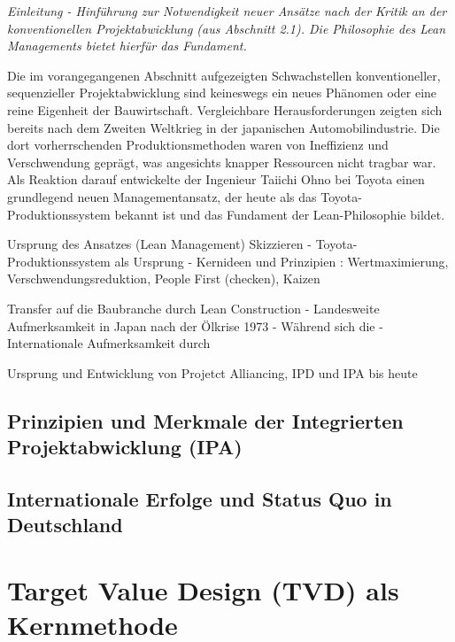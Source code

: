 
\textit{Einleitung - Hinführung zur Notwendigkeit neuer Ansätze nach der Kritik an der konventionellen Projektabwicklung (aus Abschnitt 2.1). Die Philosophie des Lean Managements bietet hierfür das Fundament.}

Die im vorangegangenen Abschnitt aufgezeigten Schwachstellen konventioneller, sequenzieller Projektabwicklung sind keineswegs ein neues Phänomen oder eine reine Eigenheit der Bauwirtschaft. Vergleichbare Herausforderungen zeigten sich bereits nach dem Zweiten Weltkrieg in der japanischen Automobilindustrie. Die dort vorherrschenden Produktionsmethoden waren von Ineffizienz und Verschwendung geprägt, was angesichts knapper Ressourcen nicht tragbar war. Als Reaktion darauf entwickelte der Ingenieur Taiichi Ohno bei Toyota einen grundlegend neuen Managementansatz, der heute als das Toyota-Produktionssystem bekannt ist und das Fundament der Lean-Philosophie bildet.

Ursprung des Ansatzes (Lean Management) Skizzieren
- Toyota-Produktionssystem\autocite[]{ohno_toyota-produktionssystem_2013} als Ursprung
- Kernideen und Prinzipien : Wertmaximierung, Verschwendungsreduktion, People First (checken), Kaizen

Transfer auf die Baubranche durch Lean Construction
- Landesweite Aufmerksamkeit in Japan nach der Ölkrise 1973
- Während sich die 
- Internationale Aufmerksamkeit durch 

Ursprung und Entwicklung von Projetct Alliancing, IPD und IPA bis heute

\subsection{Prinzipien und Merkmale der Integrierten Projektabwicklung (IPA)}
\label{sec:2.2.2}

\subsection{Internationale Erfolge und Status Quo in Deutschland}
\label{sec:2.2.3}

\clearpage

\section{Target Value Design (TVD) als Kernmethode}
\label{sec: 2.3}

